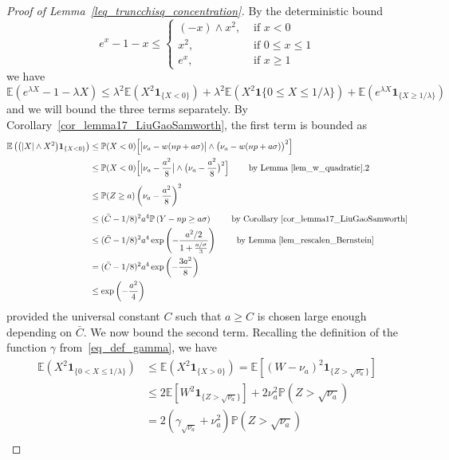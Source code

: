 \documentclass{article}
\newcommand{\one}{\mathbf{1}}
\begin{document}
\begin{proof}[Proof of Lemma~\ref{leq_truncchisq_concentration}]
By the deterministic bound
$$
e^{x}-1-x \leq \begin{cases}(-x) \wedge x^{2}, & \text { if } x<0 \\ x^{2}, & \text { if } 0 \leq x \leq 1 \\ e^{x}, & \text { if } x \geq 1\end{cases}
$$
we have
$$
\mathbb{E}\left(e^{\lambda X}-1-\lambda X\right) \leq \lambda^{2} \mathbb{E}\left(X^{2} \one_{\{X<0\}}\right)+\lambda^{2} \mathbb{E}\left(X^{2} \one{\{0 \leq X \leq 1 / \lambda\}}\right)+\mathbb{E}\left(e^{\lambda X} \one_{\{X\geq1 / \lambda\}}\right)
$$
and we will bound the three terms separately. By Corollary~\ref{cor_lemma17_LiuGaoSamworth}, the first term is bounded as
\begin{align*}
    \mathbb{E}\left(\big(|X|\land X^{2}\big) \one_{\{X<0\}}\right) & \leq \mathbb{P}(X<0)\Big[\big|\nu_{a}-w(np+a\sigma)\big|\land \big(\nu_{a}-w(np+a\sigma)\big)^{2}  \Big]\\
    & \leq \mathbb{P}(X<0)\Big[\big|\nu_{a}-\frac{a^2}{8}\big|\land \big(\nu_{a}-\frac{a^2}{8}\big)^{2}  \Big] \qquad \text{ by Lemma~\ref{lem_w_quadratic}.2}\\[5pt]
    & \leq \mathbb{P}(Z \geq a)\left(\nu_{a}-\frac{a^{2}}{8}\right)^{2} \\[5pt]
    &\leq (\bar C-1/8)^2 a^4 \mathbb P\left(Y-np \geq a \sigma\right) \qquad \text{ by Corollary~\ref{cor_lemma17_LiuGaoSamworth}}\\
    & \leq (\bar C-1/8)^2 a^4\exp \left(-\frac{a^2/2}{1 + \frac{a/\sigma}{3}}\right)\qquad \text{ by Lemma~\ref{lem_rescalen_Bernstein}}\\
    & = (\bar C-1/8)^2 a^4\exp \left(-\frac{3a^2}{8}\right)\\
    & \leq \exp\left(- \frac{a^2}{4}\right)
\end{align*}
provided the universal constant $C$ such that $a \geq C$ is chosen large enough depending on $\bar C$. We now bound the second term. Recalling the definition of the function $\gamma$ from~\eqref{eq_def_gamma}, we have
$$
\begin{aligned}
    \mathbb{E}\left(X^{2} \one_{\{0<X \leq 1 / \lambda\}}\right)&\leq \mathbb{E}\left(X^{2} \one_{\{X>0\}}\right) = \mathbb E\left[\left(W-\nu_a\right)^2 \one_{\{Z >\sqrt{\nu_a}\}}\right]\\[5pt]
    & \leq 2 \mathbb E\left[W^2 \one_{\{Z >\sqrt{\nu_a}\}}\right] + 2 \nu_a^2 \mathbb P\left(Z>\sqrt{\nu_a}\right)\\[10pt]
    & = 2 \left(\gamma_{\sqrt{\nu_a}} + \nu_a^2\right) \mathbb P\left(Z>\sqrt{\nu_a}\right) \\

\end{aligned}$$
\end{proof}
\end{document}

